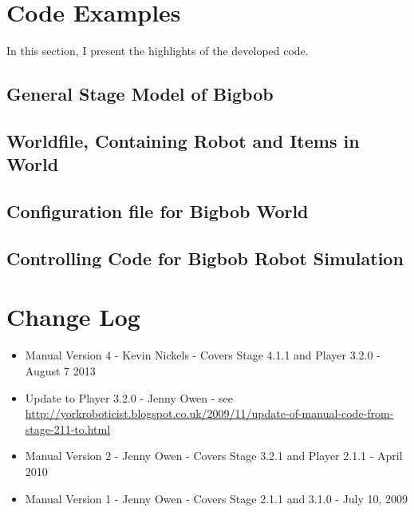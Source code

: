 \documentclass[a4paper]{report}
\begin{document}
\appendix
\chapter{Code Examples}
In this section, I present the highlights of the developed code.  

\section{General Stage Model of Bigbob}\label{app:Abigbob.inc}


\section{Worldfile, Containing Robot and Items in World}\label{app:Brobotsjunkworld}


\section{Configuration file for Bigbob World}\label{app:Cconfig}


\section{Controlling Code for Bigbob Robot Simulation}\label{app:Dbigbobcode}


\chapter{Change Log}
\begin{itemize}
\item Manual Version 4 - Kevin Nickels - Covers Stage 4.1.1 and Player 
3.2.0 - August 7 2013
\item Update to Player 3.2.0 - Jenny Owen - see
\url{http://yorkroboticist.blogspot.co.uk/2009/11/update-of-manual-code-from-stage-211-to.html}
\item Manual Version 2 - Jenny Owen - Covers Stage 3.2.1 and Player 2.1.1
- April 2010
\item Manual Version 1 - Jenny Owen - Covers Stage 2.1.1 and 3.1.0 - July 10, 2009
\end{itemize}
\end{document}
